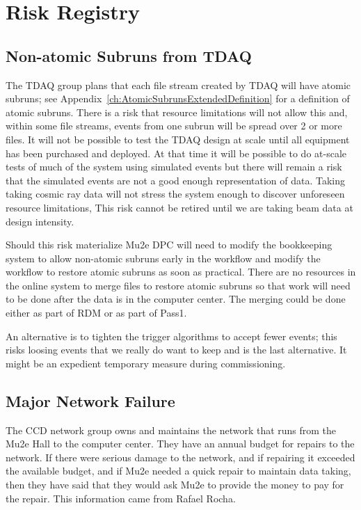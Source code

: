 \chapter{Risk Registry}
\label{ch:RiskRegistry}

\section{Non-atomic Subruns from TDAQ}
\label{sec:Risk:NonAtomicSubruns}

The TDAQ group plans that each file stream created by TDAQ will have atomic subruns;
see Appendix~\ref{ch:AtomicSubrunsExtendedDefinition} for a definition of atomic subruns.
There is a risk that resource limitations will not allow this and, within some file streams,
events from one subrun will be spread over 2 or more files.  It will not be possible
to test the TDAQ design at scale until all equipment has been purchased and deployed.
At that time it will be possible to do at-scale tests of much of the system using simulated events
but there will remain a risk that the simulated events are not a good enough representation of data.
Taking taking cosmic ray data will not stress the system enough to discover unforeseen resource limitations,
This risk cannot be retired until we are taking beam data at design intensity.

Should this risk materialize Mu2e DPC will need to modify the bookkeeping
system to allow non-atomic subruns early in the workflow and modify the workflow
to restore atomic subruns as soon as practical.
There are no resources in the online system to merge files to restore atomic subruns
so that work will need to be done after the data is in the computer center.
The merging could be done either as part of RDM or as part of Pass1.

An alternative is to tighten the trigger algorithms to accept fewer events;
this risks loosing events that we really do want to keep and is the last alternative.
It might be an expedient temporary measure during commissioning.

\section{Major Network Failure}
\label{sec:majorNetworkFailure}

The CCD network group owns and maintains the network that runs from the Mu2e Hall to the computer center.
They have an annual budget for repairs to the network.
If there were serious damage to the network,
and if repairing it exceeded the available budget,
and if Mu2e needed a quick repair to maintain data taking,
then they have said that they would ask Mu2e to provide the money to pay for the repair.
This information came from Rafael Rocha.


